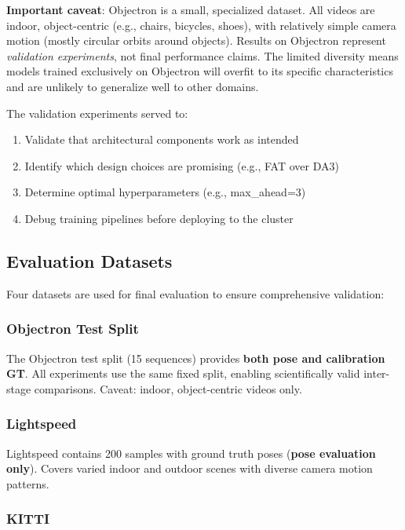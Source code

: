 \textbf{Important caveat}: Objectron is a small, specialized dataset. All videos are indoor, object-centric (e.g., chairs, bicycles, shoes), with relatively simple camera motion (mostly circular orbits around objects). Results on Objectron represent \emph{validation experiments}, not final performance claims. The limited diversity means models trained exclusively on Objectron will overfit to its specific characteristics and are unlikely to generalize well to other domains.

The validation experiments served to:
\begin{enumerate}
    \item Validate that architectural components work as intended
    \item Identify which design choices are promising (e.g., FAT over DA3)
    \item Determine optimal hyperparameters (e.g., max\_ahead=3)
    \item Debug training pipelines before deploying to the cluster
\end{enumerate}

\subsection{Evaluation Datasets}\label{sec:eval-datasets}

Four datasets are used for final evaluation to ensure comprehensive validation:

\subsubsection{Objectron Test Split}

The Objectron test split (15 sequences) provides \textbf{both pose and calibration GT}. All experiments use the same fixed split, enabling scientifically valid inter-stage comparisons. Caveat: indoor, object-centric videos only.

\subsubsection{Lightspeed}

Lightspeed contains 200 samples with ground truth poses (\textbf{pose evaluation only}). Covers varied indoor and outdoor scenes with diverse camera motion patterns.

\subsubsection{KITTI}

